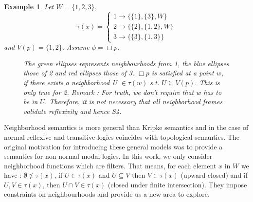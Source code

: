 \documentclass[12pt, a4paper]{scrartcl}
\newtheorem{example}[definition]{Example}
\begin{document}
\begin{example}
    Let $W = \{1,2,3\}$, 
    \[
            \tau(x) = 
            \begin{cases}
                1 \rightarrow \{\{1\}, \{3\}, W\} \\
                2 \rightarrow \{\{2\}, \{1,2\}, W\} \\
                3 \rightarrow \{\{3\}, \{1,3\}\}
            \end{cases}
    \] 
    and $V(p) = \{1,2\}$. Assume $\phi = \Box p$.
    
    \begin{figure}[h]
    \centering
    \caption{The green ellipses represents neighbourhoods from 1, the blue ellipses those of 2 and red ellipses those of 3. $\Box p$ is satisfied at a point $w$,
    if there exists a neighborhood U $\in \tau(w)$ s.t. $U \subseteq V(p)$. This is only true for 2.
    \newline Remark : For truth, we don't require that $w$ has to be in $U$. Therefore, it is not necessary that all neighborhood frames validate reflexivity and hence S4.}
    \end{figure}
\end{example}  

Neighborhood semantics is more general than Kripke semantics and in the case of normal reflexive and transitive logics coincides with topological semantics.
The original motivation for introducing these general models was to provide a semantics for non-normal modal logics. In this work, we only consider neighborhood functions which are filters.
That means, for each element $x$ in $W$ we have : $\emptyset \notin \tau(x)$, if $U \in \tau(x)$ and $U \subseteq V$ then $V \in \tau(x)$ (upward closed) and if $U,V \in \tau(x)$, then $U \cap V \in \tau(x)$ (closed under finite intersection).
They impose constraints on neighbourhoods and provide us a new area to explore.
\end{document}
